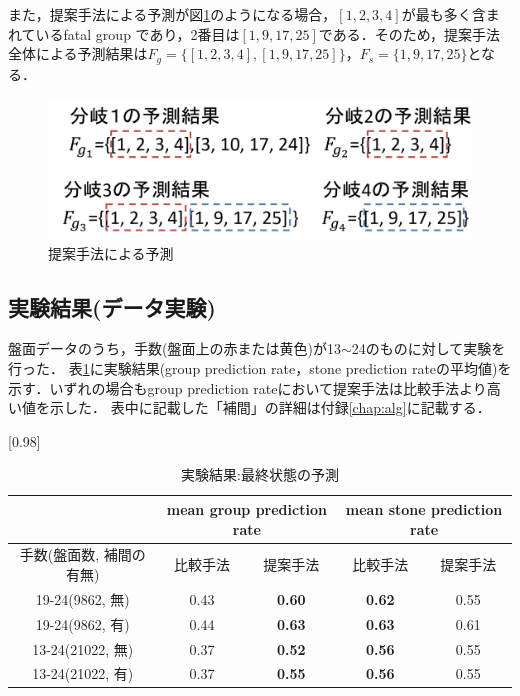 また，提案手法による予測が図\ref{fig:g-example}のようになる場合，$[1,2,3,4]$が最も多く含まれているfatal group
であり，2番目は$[1, 9, 17, 25]$である．そのため，提案手法全体による予測結果は$F_g=\{[1, 2, 3, 4], [1, 9, 17, 25]\}， F_s=\{1, 9, 17, 25\}$となる．
\begin{figure}[htbp]
	\centering
	\includegraphics[width=\linewidth]{./figure/g-example.png}
	\caption{提案手法による予測}
	\label{fig:g-example}
\end{figure}


\subsection{実験結果(データ実験)}
盤面データのうち，手数(盤面上の赤または黄色)が13$\sim$24のものに対して実験を行った．
表\ref{table:result-online}に実験結果(group prediction rate，stone prediction rateの平均値)を示す．いずれの場合もgroup prediction rateにおいて提案手法は比較手法より高い値を示した．
表中に記載した「補間」の詳細は付録\ref{chap:alg}に記載する．
\begin{table}[H]
	\caption{実験結果:最終状態の予測}
	\centering
	\scalebox{0.98}[0.98]{
		\begin{tabular}{c|c|c|c|c}
			\multicolumn{1}{c}{} & \multicolumn{2}{|c|}{mean group prediction rate} 
			& \multicolumn{2}{c|}{mean stone prediction rate}\\ \hline \hline
			手数(盤面数, 補間の有無)  & 比較手法  & 提案手法 & 比較手法 & 提案手法  \\ \hline
			19-24(9862, 無)  & 0.43  & \bf{0.60} & \bf{0.62}  & 0.55  \\
			19-24(9862, 有) & 0.44   & \bf{0.63} & \bf{0.63}  & 0.61   \\
			13-24(21022, 無) & 0.37  & \bf{0.52} & \bf{0.56} & 0.55   \\
			13-24(21022, 有)   & 0.37 & \bf{0.55} & \bf{0.56} & 0.55   \\
		\end{tabular}
	}
	\label{table:result-online}
\end{table}
